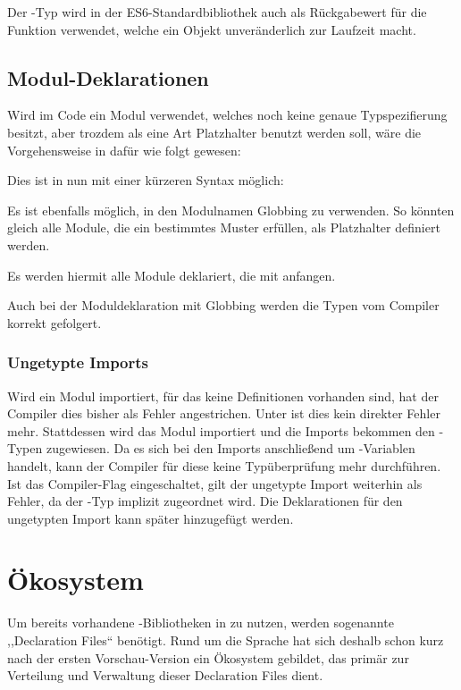 
Der -Typ wird in der ES6-Standardbibliothek auch als Rückgabewert für die Funktion  verwendet, welche ein Objekt unveränderlich zur Laufzeit macht.

\subsection{Modul-Deklarationen}
Wird im Code ein Modul verwendet, welches noch keine genaue Typspezifierung besitzt, aber trozdem als eine Art Platzhalter benutzt werden soll, wäre die Vorgehensweise in  dafür wie folgt gewesen:


Dies ist in  nun mit einer kürzeren Syntax möglich:


Es ist ebenfalls möglich, in den Modulnamen Globbing zu verwenden. So könnten gleich alle Module, die ein bestimmtes Muster erfüllen, als Platzhalter definiert werden.


Es werden hiermit alle Module deklariert, die mit  anfangen.

Auch bei der Moduldeklaration mit Globbing werden die Typen vom Compiler korrekt gefolgert.


\subsubsection*{Ungetypte Imports}
Wird ein Modul importiert, für das keine Definitionen vorhanden sind, hat der Compiler dies bisher als Fehler angestrichen. Unter  ist dies kein direkter Fehler mehr. Stattdessen wird das Modul importiert und die Imports bekommen den \tsany-Typen zugewiesen. Da es sich bei den Imports anschließend um \tsany-Variablen handelt, kann der Compiler für diese keine Typüberprüfung mehr durchführen. Ist das Compiler-Flag  eingeschaltet, gilt der ungetypte Import weiterhin als Fehler, da der \tsany-Typ implizit zugeordnet wird.
Die Deklarationen für den ungetypten Import kann später hinzugefügt werden.

\section{Ökosystem}
\label{ecosystem}
Um bereits vorhandene \js-Bibliotheken in \ts zu nutzen, werden sogenannte ,,Declaration Files`` benötigt. Rund um die Sprache \ts hat sich deshalb schon kurz nach der ersten Vorschau-Version ein Ökosystem gebildet, das primär zur Verteilung und Verwaltung dieser Declaration Files dient.

